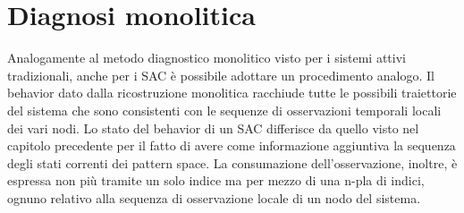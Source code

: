 \newpage
\section{Diagnosi monolitica} \label{section_greedy}
Analogamente al metodo diagnostico monolitico visto per i sistemi attivi tradizionali, anche per i SAC è possibile adottare un procedimento analogo. Il behavior dato dalla ricostruzione monolitica racchiude tutte le possibili traiettorie del sistema che sono consistenti con le sequenze di osservazioni temporali locali dei vari nodi.
Lo stato del behavior di un SAC differisce da quello visto nel capitolo precedente per il fatto di avere come informazione aggiuntiva la sequenza degli stati correnti dei pattern space. La consumazione dell'osservazione, inoltre, è espressa non più tramite un solo indice ma per mezzo di una n-pla di indici, ognuno relativo alla sequenza di osservazione locale di un nodo del sistema.

